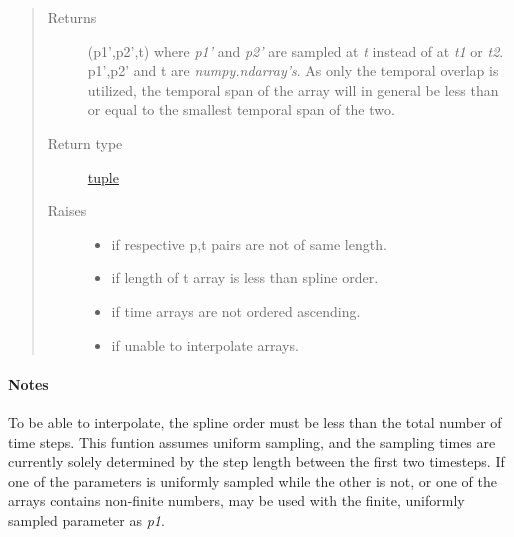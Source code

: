 \documentclass[letterpaper,10pt,english]{sphinxhowto}
\begin{document}
\begin{fulllineitems}
\begin{quote}
\begin{description}
\begin{itemize}
\end{itemize}

\item[{Returns}] \leavevmode
(p1',p2',t) where \emph{p1'} and \emph{p2'} are sampled at \emph{t} instead of at
\emph{t1} or \emph{t2}. p1',p2' and t are \emph{numpy.ndarray's}. As only the
temporal overlap is utilized, the temporal span of the array will
in general be less than or equal to the smallest temporal span of
the two.

\item[{Return type}] \leavevmode
\href{https://docs.python.org/library/functions.html\#tuple}{tuple}

\item[{Raises}] \leavevmode
{}
\begin{itemize}
\item {} 
if respective p,t pairs are not of same length.

\item {} 
if length of t array is less than spline order.

\item {} 
if time arrays are not ordered ascending.

\item {} 
if unable to interpolate arrays.

\end{itemize}

\end{description}\end{quote}
\paragraph{Notes}

To be able to interpolate, the spline order must be less than the
total number of time steps. This funtion assumes uniform sampling,
and the sampling times are currently solely determined by the step
length between the first two timesteps. If one of the parameters is
uniformly sampled while the other is not, or one of the arrays
contains non-finite numbers,  may be used with
the finite, uniformly sampled parameter as \emph{p1}.




{\hyperref[swtools_doc:swtools.plot_align]{\emph{}}}



\end{fulllineitems}
\end{document}
